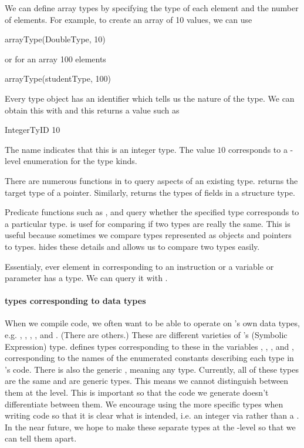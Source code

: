 We can define array types  by specifying the
type of each element and the number of elements.
For example, to create an array of 10  values,
we can use
\begin{RCode}
arrayType(DoubleType, 10)  
\end{RCode}
or for an array 100  elements
\begin{RCode}
arrayType(studentType, 100)    
\end{RCode}


Every type object has an identifier which tells us the nature of the
type.  We can obtain this with  and this 
returns a value such as 
\begin{ROutput}
IntegerTyID 
         10   
\end{ROutput}
The name indicates that this is an integer type.
The value $10$  corresponds to a \C-level enumeration for the type kinds.


There are numerous functions in \Rllvm{} to query 
aspects of an existing type.
 returns the target type of a pointer.
Similarly, 
 returns the types of fields in a structure type.

Predicate functions such as , 
and  query whether the specified type corresponds
to a particular type.   is usef for comparing if two
types are really the same. This is useful because sometimes we compare
types represented as \R{} objects and pointers to \llvm{} types.
 hides these details and allows us to compare two
types easily.


Essentialy, ever element in \llvm{} corresponding to an instruction or
a variable or parameter has a type. We can query it with
.



\paragraph{\llvm{} types corresponding to \R{} data types}
When we compile \R{} code, we often want to be able to operate on \R's
own data types, e.g. , ,
, ,  and .
(There are others.)  These are different varieties of \R's
 (Symbolic Expression) type.  \Rllvm{} defines types
corresponding to these in the variables ,
, ,  and
, corresponding to the names of the enumerated
constants describing each type in \R's \C{} code.  There is also the
generic , meaning any \R{} type.  Currently, all of
these types are the same and are generic \R{} types.  This means we
cannot distinguish between them at the \llvm{} level. This is
important so that the code we generate doesn't differentiate between
them.  We encourage using the more specific types when writing \R{}
code so that it is clear what is intended, i.e.  an integer via
 rather than a .  In the near
future, we hope to make these separate types at the \llvm-level so
that we can tell them apart.

% 



